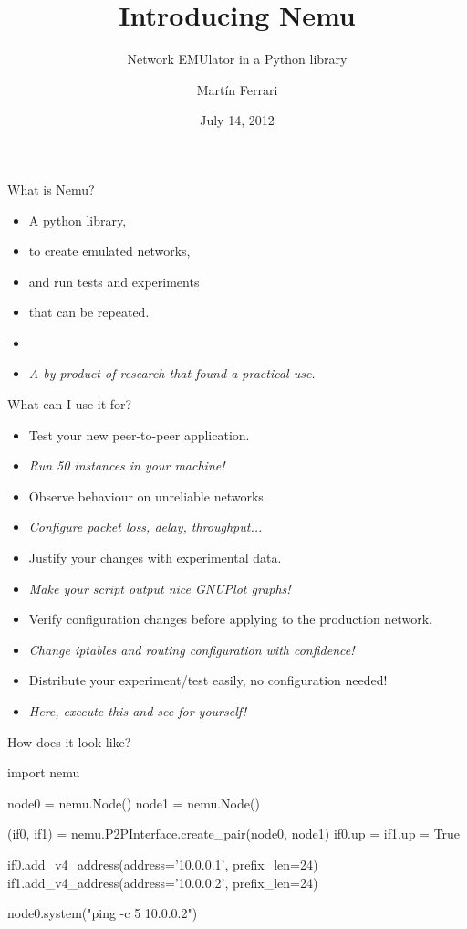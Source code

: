 \documentclass{beamer}
\title{Introducing Nemu}
\subtitle{Network EMUlator in a \hsout{box} Python library}
\author{Martín Ferrari}
\institute[DebConf 12]{\pgfuseimage{debian-logo-big}}
\date{July 14, 2012}
\begin{document}
\begin{frame}
  \titlepage
\end{frame}

\begin{frame}{What is Nemu?}
  \begin{itemize}
  \item A \alert{python} library,
  \item to create \alert{emulated networks},
  \item and run \alert{tests and experiments}
  \item that can be \alert{repeated}.
  \item[]{}
  \item[] \em{A by-product of research that found a practical use.}
  \end{itemize}
\end{frame}

\begin{frame}{What can I use it for?}
  \begin{itemize}
  \item Test your new peer-to-peer application.
  \item[] \small{\em{Run 50 instances in your machine!}}
  \vfill
  \item Observe behaviour on unreliable networks.
  \item[] \small{\em{Configure packet loss, delay, throughput...}}
  \vfill
  \item Justify your changes with experimental data.
  \item[] \small{\em{Make your script output nice GNUPlot graphs!}}
  \vfill
  \item Verify configuration changes before applying to the production network.
  \item[] \small{\em{Change iptables and routing configuration with
  confidence!}}
  \vfill
  \item Distribute your experiment/test easily, no configuration needed!
  \item[] \small{\em{Here, execute this and see for yourself!}}
  \end{itemize}
\end{frame}

\begin{frame}[fragile]{How does it look like?}
\begin{semiverbatim}
import nemu

node0 = nemu.Node()
node1 = nemu.Node()

(if0, if1) = nemu.P2PInterface.create_pair(node0, node1)
if0.up = if1.up = True

if0.add_v4_address(address='10.0.0.1', prefix_len=24)
if1.add_v4_address(address='10.0.0.2', prefix_len=24)

node0.system("ping -c 5 10.0.0.2")
\end{semiverbatim}
\end{frame}
\end{document}
